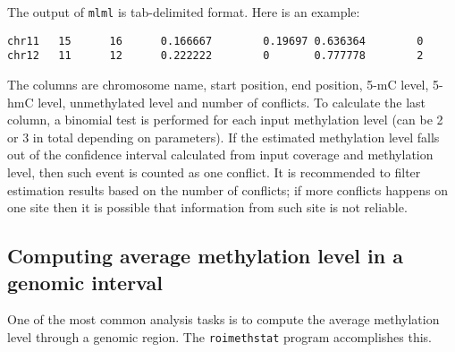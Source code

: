 \documentclass[10pt]{article}
\newcommand{\prog}[1]{\texttt{#1}}
\begin{document}
{{The output of \prog{mlml} is tab-delimited format. Here is an example:
\begin{verbatim}
chr11   15      16      0.166667        0.19697 0.636364        0
chr12   11      12      0.222222        0       0.777778        2
\end{verbatim}
The columns are chromosome name, start position, end position, 5-mC level,
5-hmC level, unmethylated level and number of conflicts. To calculate the last
column, a binomial test is performed for each input methylation level
(can be 2 or 3 in total depending on parameters). If the estimated
methylation level falls out of the confidence interval calculated from
input coverage and methylation level, then such event is counted as one
conflict. It is recommended to filter estimation results based on the number
of conflicts; if more conflicts happens on one site then it is possible
that information from such site is not reliable.

\subsection{Computing average methylation level in a genomic interval}
\label{sec:roimethstat}

One of the most common analysis tasks is to compute the average
methylation level through a genomic region. The \prog{roimethstat}
program accomplishes this.
 
}}
\end{document}
